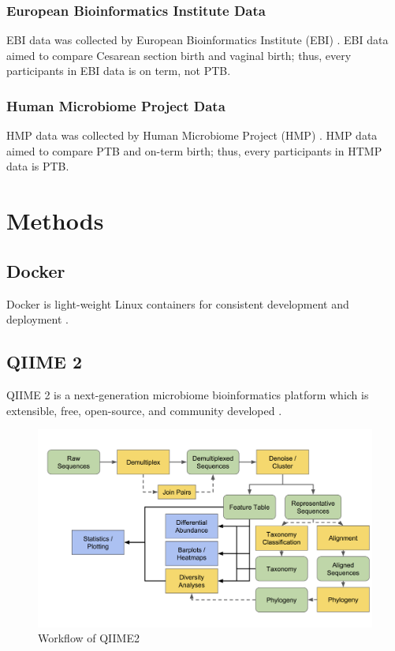 \documentclass[a4paper]{article}
\begin{document}
            \subsubsection[EBI Data]{European Bioinformatics Institute Data}
                EBI data was collected by European Bioinformatics Institute (EBI) \cite{validate1}. EBI data aimed to compare Cesarean section birth and vaginal birth; thus, every participants in EBI data is on term, not PTB.

            \subsubsection[HMP Data]{Human Microbiome Project Data}
                HMP data was collected by Human Microbiome Project (HMP) \cite{validate2}. HMP data aimed to compare PTB and on-term birth; thus, every participants in HTMP data is PTB.
    \section{Methods}
        \subsection{Docker}
            Docker is light-weight Linux containers for consistent development and deployment \cite{docker1}.

        \subsection{QIIME 2}
            QIIME 2 is a next-generation microbiome bioinformatics platform which is extensible, free, open-source, and community developed \cite{qiime1, qiime2, qiime3}.

            \begin{figure}[p]
                \centering
                \includegraphics[width=0.6 \linewidth]{figures/qiime.png}
                \caption{Workflow of QIIME2}
                \label{fig:qiime2}
            \end{figure}
\end{document}
